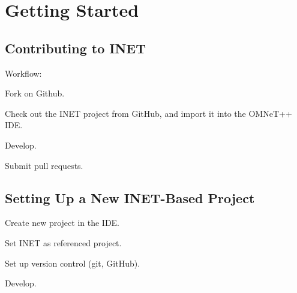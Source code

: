 \chapter{Getting Started}
\label{cha:gettingstarted}


\section{Contributing to INET}

Workflow:

Fork on Github.

Check out the INET project from GitHub, and import it into the OMNeT++ IDE.

Develop.

Submit pull requests.


\section{Setting Up a New INET-Based Project}

Create new project in the IDE.

Set INET as referenced project.

Set up version control (git, GitHub).

Develop.






